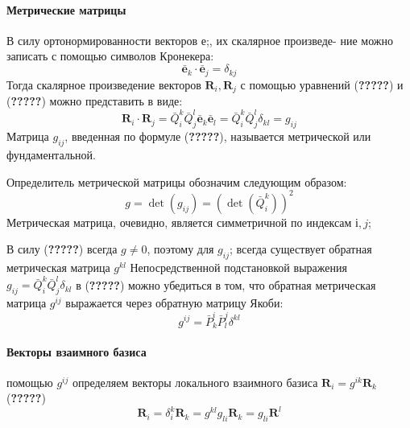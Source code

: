\paragraph{Метрические матрицы}
В силу ортонормированности векторов е;, их скалярное произведе- ние можно записать с помощью символов Кронекера:
\begin{equation*}
    \bar{\textbf{e}}_k \cdot \bar{\textbf{e}}_j = \delta_{kj}
\end{equation*}
Тогда скалярное произведение векторов $\textbf{R}_i, \textbf{R}_j$ с помощью уравнений (\textbf{?????}) и (\textbf{?????}) можно представить в виде:
\begin{equation*}
    \textbf{R}_i\cdot \textbf{R}_j = 
    \bar{Q}^k_i \bar{Q}^l_j \bar{\textbf{e}}_k \bar{\textbf{e}}_l =
    \bar{Q}^k_i \bar{Q}^l_j \delta_{kl} =
    g_{ij}
\end{equation*}
 Матрица $g_{ij}$, введенная по формуле (\textbf{?????}), называется
метрической или фундаментальной.

Определитель метрической матрицы обозначим следующим образом:
\begin{equation*}
    g = \det(g_{ij}) = (\det(\bar{Q}^k_i))^2
\end{equation*}
Метрическая матрица, очевидно, является симметричной по индексам $і,j$;

В силу (\textbf{?????}) всегда $g \ne 0$, поэтому для $g_{ij}$; всегда существует обратная метрическая матрица $g^{kl}$
Непосредственной подстановкой выражения $g_{ij} = \bar{Q}^k_i \bar{Q}^l_j \delta_{kl}$ в (\textbf{?????}) можно убедиться в том, что обратная метрическая матрица $g^{ij}$ выражается через обратную матрицу Якоби:
\begin{equation*}
    g^{ij} = \bar{P}^i_k \bar{P}^j_l \delta^{kl}
\end{equation*}
\paragraph{Векторы взаимного базиса}
 помощью $g^{ij}$ определяем векторы локального взаимного базиса $\textbf{R}_i =g^{ik}\textbf{R}_k$
(\textbf{?????})
\begin{equation*}
    \textbf{R}_i = \delta^k_i\textbf{R}_k =
    g^{kl}g_{li}\textbf{R}_k = g_{li}\textbf{R}^l
\end{equation*}